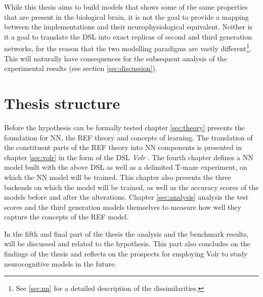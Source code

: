 \documentclass[report.tex]{subfiles}
\begin{document}
While this thesis aims to build models that shows some of the same
properties that are present in the biological brain,  
it is not the goal to provide a mapping between the
implementations and their neurophysiological equivalent.
Neither is it a goal to translate the \gls{DSL} into exact replicas
of second and third generation networks, for the reason that the
two modelling paradigms are vastly different\footnote{See \ref{sec:nn}
for a detailed description of the dissimilarities.}.
This will naturally have consequences for the subsequent analysis of the
experimental results (see section \ref{sec:discussion}).

\section{Thesis structure}
Before the hypothesis can be formally tested chapter \ref{sec:theory}
presents the foundation for \gls{NN}, the \gls{REF} theory and
concepts of learning.
The translation of the constituent parts of the \gls{REF} theory
into \gls{NN} components is presented in chapter \ref{sec:volr} in 
the form of the \gls{DSL} \textit{Volr} .
The fourth chapter defines a \gls{NN} model built with the above
\gls{DSL} as well as a delimited T-maze experiment, on which the 
\gls{NN} model will be trained.
This chapter also presents the three \gls{backend}s on which the 
model will be trained, as well as the accuracy scores of the models
before and after the alterations.
Chapter \ref{sec:analysis} analysis the test scores and the third 
generation models themselves to measure how well they capture the
concepts of the \gls{REF} model.

In the fifth and final part of the thesis the analysis and the benchmark
results, will be discussed and related to the hypothesis.
This part also concludes on the findings of the thesis and
reflects on the prospects for employing Volr to study neurocognitive
models in the future.
\end{document}
